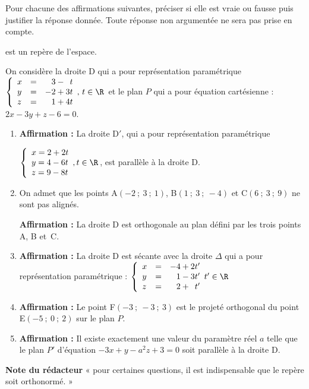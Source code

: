\medskip

Pour chacune des affirmations suivantes, préciser si elle est vraie ou fausse puis justifier la réponse donnée. Toute réponse non argumentée ne sera pas prise en compte.

\bigskip
\Oijk{} est un repère de l'espace.

On considère la droite D qui a pour représentation paramétrique $\left\{\begin{array}{lcl}x&=&\phantom{-}3 - \phantom{3}t \\ y&=&-2 + 3t \\ z&=&\phantom{-}1 + 4t\end{array},\, t \in \R\right.$ et le plan $P$ qui a pour équation cartésienne : $2x -3y + z - 6 = 0$.

\medskip

\begin{enumerate}
\item \textbf{Affirmation :} 
La droite $\mathrm{D}'$, qui a pour représentation paramétrique 

$\left\{\begin{array}{l}x=2+2 t \\ y=4-6 t \\ z=9-8 t\end{array}, t \in \R\right.$, est parallèle à la droite D.

\item On admet que les points A$(-2 ~;~ 3 ~;~ 1)$, B$(1~;~ 3 ~;~-4)$ et C$(6 ~;~ 3 ~;~ 9)$ ne sont pas alignés.

\textbf{Affirmation :} La droite D est orthogonale au plan défini par les trois points A, B et~C.

\item \textbf{Affirmation :} La droite D est sécante avec la droite $\Delta$ qui a pour représentation paramétrique : $\left\{\begin{array}{lcl}x&=&-4+2 t' \\ y&=&\phantom{-}1-3 t' \\ z&=&\phantom{-}2+\phantom{2}t'\end{array} t' \in \R\right.$

\item \textbf{Affirmation :} Le point F$(-3~;~-3~;~3)$ est le projeté orthogonal du point E$(-5~;~0~;~2)$ sur le plan $P$.

\item \textbf{Affirmation :} Il existe exactement une valeur du paramètre réel $a$ telle que le plan $P'$ d'équation $-3x + y - a^{2} z+3=0$ soit parallèle à la droite D.
\end{enumerate}

\smallskip

\textbf{Note du rédacteur} «  pour certaines questions, il est indispensable que le repère soit orthonormé. »

\bigskip

